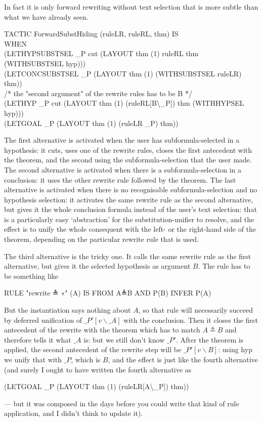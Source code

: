 In fact it is only forward rewriting without text selection that is more subtle than what we have already seen.
\begin{japeish}
TACTIC ForwardSubstHiding (ruleLR, ruleRL, thm) IS \\
\tab WHEN     \\
\tab \tab (LETHYPSUBSTSEL \_P  cut (LAYOUT thm (1) ruleRL thm (WITHSUBSTSEL hyp))) \\
\tab \tab (LETCONCSUBSTSEL \_P (LAYOUT thm (1) (WITHSUBSTSEL ruleLR) thm)) \\
\tab \tab /* the "second argument" of the rewrite rules has to be B */ \\
\tab \tab (LETHYP \_P cut (LAYOUT thm (1) (ruleRL[B{\textbackslash}\_P]) thm (WITHHYPSEL hyp))) \\
\tab \tab (LETGOAL \_P (LAYOUT thm (1) (ruleLR \_P) thm)) \\
\end{japeish}
The first alternative is activated when the user has subformula-selected in a hypothesis: it cuts, uses one of the rewrite rules, closes the first antecedent with the theorem, and the second using the subformula-selection that the user made. The second alternative is activated when there is a subformula-selection in a conclusion: it uses the other rewrite rule followed by the theorem. The last alternative is activated when there is no recognisable subformula-selection and no hypothesis selection: it activates the same rewrite rule as the second alternative, but gives it the whole conclusion formula instead of the user's text selection: that is a particularly easy `abstraction' for the substitution-unifier to resolve, and the effect is to unify the whole consequent with the left- or the right-hand side of the theorem, depending on the particular rewrite rule that is used.

The third alternative is the tricky one. It calls the same rewrite rule as the first alternative, but gives it the selected hypothesis as argument $B$. The rule has to be something like
\begin{japeish}
RULE "rewrite ≜ «" (A) IS FROM A≜B AND P(B) INFER P(A)
\end{japeish}
But the instantiation says nothing about $A$, so that rule will necessarily succeed by deferred unification of $\_P'[v{\backslash}\_A]$ with the conclusion. Then it closes the first antecedent of the rewrite with the theorem which has to match $A≜B$ and therefore tells it what $\_A$ is: but we still don't know $\_P'$. After the theorem is applied, the second antecedent of the rewrite step will be $\_P'[v{\backslash}B]$: using hyp we unify that with $\_P$, which is $B$, and the effect is just like the fourth alternative (and surely I ought to have written the fourth alternative as
\begin{japeish}
(LETGOAL \_P (LAYOUT thm (1) (ruleLR[A{\textbackslash}\_P]) thm))
\end{japeish}
--- but it was composed in the days before you could write that kind of rule application, and I didn't think to update it).

